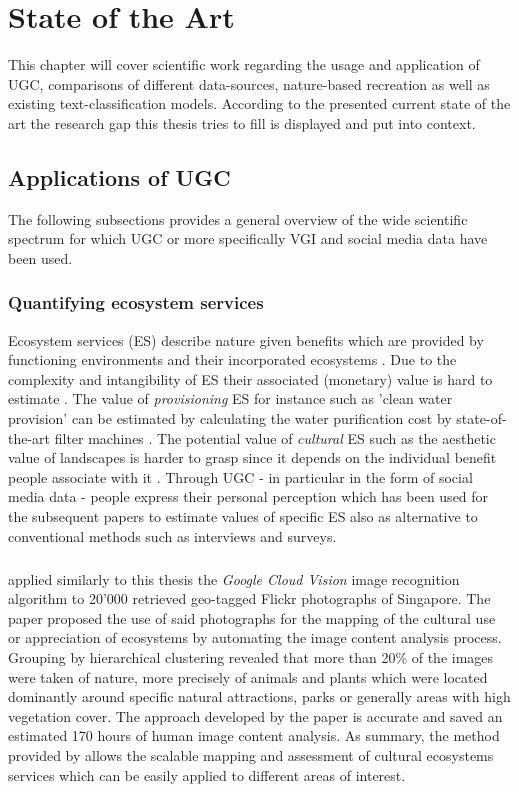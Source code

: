 \chapter{State of the Art} \label{state_of_the_art}
This chapter will cover scientific work regarding the usage and application of UGC, comparisons of different data-sources, nature-based recreation as well as existing text-classification models. According to the presented current state of the art the research gap this thesis tries to fill is displayed and put into context.

\section{Applications of UGC} \label{applications_UGC}
The following subsections provides a general overview of the wide scientific spectrum for which UGC or more specifically VGI and social media data have been used.

\subsection{Quantifying ecosystem services}
Ecosystem services (ES) describe nature given benefits which are provided by functioning environments and their incorporated ecosystems \parencite{Jacobs2014}. Due to the complexity and intangibility of ES their associated (monetary) value is hard to estimate \parencite{ACostanza1997}. The value of \textit{provisioning} ES for instance such as 'clean water provision' can be estimated by calculating the water purification cost by state-of-the-art filter machines \parencite{Africa2018}. The potential value of \textit{cultural} ES such as the aesthetic value of landscapes is harder to grasp since it depends on the individual benefit people associate with it \parencite{Hunziker1995}. Through UGC - in particular in the form of social media data - people express their personal perception which has been used for the subsequent papers to estimate values of specific ES also as alternative to conventional methods such as interviews and surveys.  
\paragraph*{\textcite{Richards2018}} applied similarly to this thesis the \textit{Google Cloud Vision} image recognition algorithm to 20'000 retrieved geo-tagged Flickr photographs of Singapore. The paper proposed the use of said photographs for the mapping of the cultural use or appreciation of ecosystems by automating the image content analysis process. Grouping by hierarchical clustering revealed that more than 20\% of the images were taken of nature, more precisely of animals and plants which were located dominantly around specific natural attractions, parks or generally areas with high vegetation cover. The approach developed by the paper is accurate and saved an estimated 170 hours of human image content analysis. As summary, the method provided by \textcite{Richards2018} allows the scalable mapping and assessment of cultural ecosystems services which can be easily applied to different areas of interest.

